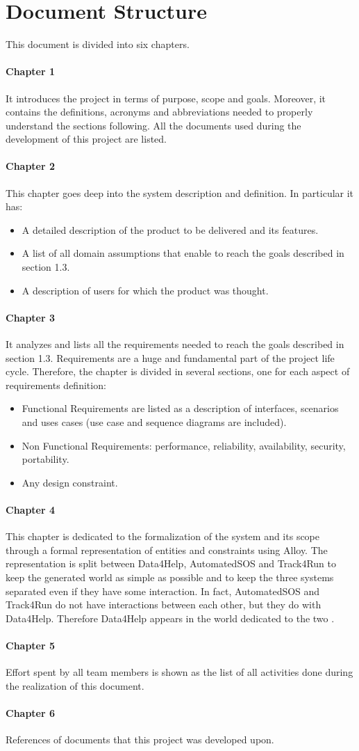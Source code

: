 \documentclass[../rasd.tex]{subfiles}
\begin{document}
		\section{Document Structure}
		This document is divided into six chapters.
		\paragraph{Chapter 1}
		It introduces the project in terms of purpose, scope and goals. Moreover, it contains the definitions, acronyms and abbreviations needed to properly understand the sections following. All the documents used during the development of this project are listed.
		\paragraph{Chapter 2}
		This chapter goes deep into the system description and definition. In particular it has:
		\begin{itemize}
			\item A detailed description of the product to be delivered and its features.
			\item A list of all domain assumptions that enable to reach the goals described in section 1.3.
			\item A description of users for which the product was thought.
		\end{itemize}
		\paragraph{Chapter 3}
		It analyzes and lists all the requirements needed to reach the goals described in section 1.3. Requirements are a huge and fundamental part of the project life cycle. Therefore, the chapter is divided in several sections, one for each aspect of requirements definition:
		\begin{itemize}
			\item Functional Requirements are listed as a description of interfaces, scenarios and uses cases (use case and sequence diagrams are included).
			\item Non Functional Requirements: performance, reliability, availability, security, portability.
			\item Any design constraint.
		\end{itemize}
		\paragraph{Chapter 4}
		This chapter is dedicated to the formalization of the system and its scope through a formal representation of entities and constraints using Alloy. The representation is split between Data4Help, AutomatedSOS and Track4Run to keep the generated world as simple as possible and to keep the three systems separated even if they have some interaction. In fact, AutomatedSOS and Track4Run do not have interactions between each other, but they do with Data4Help. Therefore Data4Help appears in the world dedicated to the two .
		\paragraph{Chapter 5}
		Effort spent by all team members is shown as the list of all activities done during the realization of this document.
		\paragraph{Chapter 6}
		References of documents that this project was developed upon.
		
\end{document}
